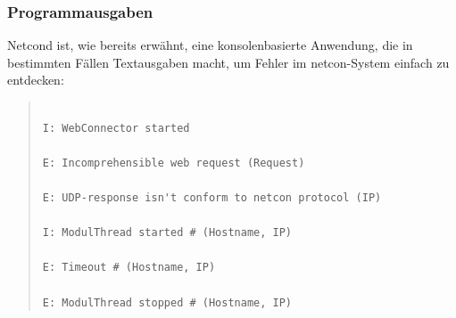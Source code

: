 \documentclass[a4paper,14pt,headsepline]{scrartcl}
\begin{document}
\begin{figure}[h]
\begin{center}
\end{center}
\end{figure}

\begin{figure}[h]
\begin{center}
\end{center}
\end{figure}

\newpage

\subsubsection{Programmausgaben}

Netcond ist, wie bereits erwähnt, eine konsolenbasierte Anwendung, die in bestimmten Fällen Textausgaben macht, um Fehler im netcon-System einfach zu entdecken:

\begin{quote}
\begin{verbatim}

I: WebConnector started

E: Incomprehensible web request (Request)

E: UDP-response isn't conform to netcon protocol (IP)

I: ModulThread started # (Hostname, IP)

E: Timeout # (Hostname, IP)

E: ModulThread stopped # (Hostname, IP)

\end{verbatim}
\end{quote} 
\end{document}
